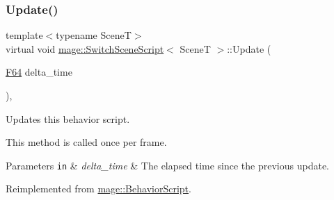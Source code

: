 \subsubsection{\texorpdfstring{Update()}{Update()}}
{\footnotesize\ttfamily template$<$typename SceneT$>$ \\
virtual void \hyperlink{classmage_1_1_switch_scene_script}{mage\+::\+Switch\+Scene\+Script}$<$ SceneT $>$\+::Update (\begin{DoxyParamCaption}\item[{\hyperlink{namespacemage_ad26233bbec640deda836e572c1a23708}{F64}}]{delta\+\_\+time }\end{DoxyParamCaption})\hspace{0.3cm}{\ttfamily [override]}, {\ttfamily [virtual]}}

Updates this behavior script.

This method is called once per frame.


\begin{DoxyParams}[1]{Parameters}
\mbox{\tt in}  & {\em delta\+\_\+time} & The elapsed time since the previous update. \\
\hline
\end{DoxyParams}


Reimplemented from \hyperlink{classmage_1_1_behavior_script_a58c0fb3e1f2f3fb3a41e658a99b84a21}{mage\+::\+Behavior\+Script}.

